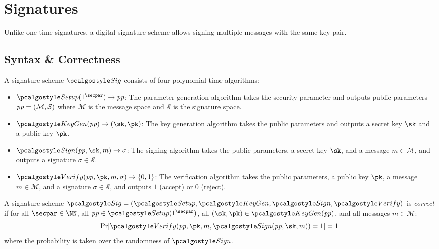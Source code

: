\section{Signatures}\label{sec:signatures}

 Unlike one-time signatures, a digital signature scheme allows signing multiple messages with the same key pair.

\subsection{Syntax \& Correctness}

\begin{definition}
  A signature scheme $\algo{Sig}$ consists of four polynomial-time algorithms:
  \begin{itemize}
    \item $\algo{Setup}(1^\secpar) \rightarrow \params$: The parameter generation algorithm takes the security parameter and outputs public parameters $\mathit{pp} = (\mathcal{M}, \mathcal{S})$ where $\mathcal{M}$ is the message space and $\mathcal{S}$ is the signature space.
    \item $\algo{KeyGen}(\params) \rightarrow (\sk, \pk)$: The key generation algorithm takes the public parameters and outputs a secret key $\sk$ and a public key $\pk$.
    \item $\algo{Sign}(\params, \sk, m) \rightarrow \sigma$: The signing algorithm takes the public parameters, a secret key $\sk$, and a message $m \in \mathcal{M}$, and outputs a signature $\sigma \in \mathcal{S}$.
    \item $\algo{Verify}(\params, \pk, m, \sigma) \rightarrow \{0, 1\}$: The verification algorithm takes the public parameters, a public key $\pk$, a message $m \in \mathcal{M}$, and a signature $\sigma \in \mathcal{S}$, and outputs $1$ (accept) or $0$ (reject).
  \end{itemize}
\end{definition}

\begin{definition}[Correctness]\label{def:sig-correctness}
  A signature scheme $\algo{Sig} = (\algo{Setup}, \algo{KeyGen}, \algo{Sign}, \algo{Verify})$ is \emph{correct} if for all $\secpar \in \NN$, all $\params \in \algo{Setup}(1^\secpar)$, all $(\sk, \pk) \in \algo{KeyGen}(\params)$, and all messages $m \in \mathcal{M}$:
  \[
    \Pr[\algo{Verify}(\params, \pk, m, \algo{Sign}(\params, \sk, m)) = 1] = 1
  \]
  where the probability is taken over the randomness of $\algo{Sign}$.
\end{definition}

